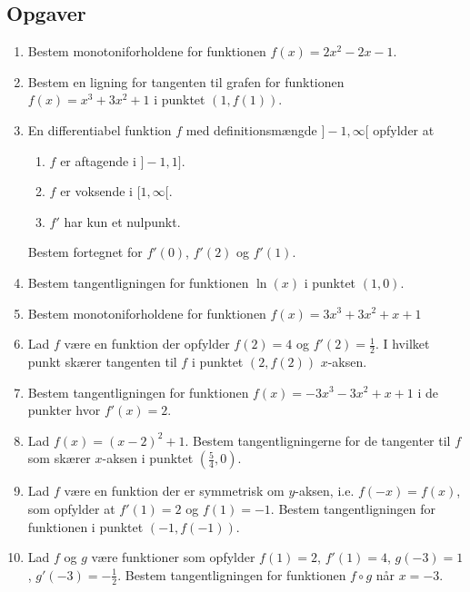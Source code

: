 \subsection{Opgaver}

\begin{enumerate}
	
	\item Bestem monotoniforholdene for funktionen $f(x)=2x^2-2x-1$.
	
	\item Bestem en ligning for tangenten til grafen for funktionen $f(x)=x^3+3x^2+1$ i punktet $(1,f(1))$.
	
	\item En differentiabel funktion  $ f $ med definitionsmængde $]-1,\infty[$ opfylder at
	\begin{enumerate}
		\item $f$ er aftagende i $]-1,1]$.
		 \item $f$ er voksende i $[1,\infty[$.
		\item $f'$ har kun et nulpunkt.
	\end{enumerate}
	Bestem fortegnet for $f'(0)$, $f'(2)$ og $f'(1)$.
	
	
	\item Bestem tangentligningen for funktionen $\ln(x)$ i punktet $(1,0)$.
	
	\item Bestem monotoniforholdene for funktionen $f(x)=3x^3+3x^2+x+1$
	

	
	\item Lad $f$ være en funktion der opfylder $f(2)=4$ og $f'(2)=\frac{1}{2}$. I hvilket punkt skærer tangenten til $f$ i punktet $(2,f(2))$ $x$-aksen.
	
	\item Bestem tangentligningen for funktionen $f(x)=-3x^3-3x^2+x+1$ i de punkter hvor $f'(x)=2$.
	
	
	\item Lad $f(x)=(x-2)^2+1$. Bestem tangentligningerne for de tangenter til $f$ som skærer $x$-aksen i punktet $(\frac{5}{4},0)$.  
	
	\item Lad $f$ være en funktion der er symmetrisk om $y$-aksen, i.e. $f(-x)=f(x)$, som opfylder at $f'(1)=2$ og $f(1)=-1$. Bestem tangentligningen for funktionen i punktet $(-1,f(-1))$. 
	
	
	\item Lad $f$ og $g$ være funktioner som opfylder $f(1)=2$, $f'(1)=4$, $g(-3)=1$, $g'(-3)=-\frac{1}{2}$. Bestem tangentligningen for funktionen $f\circ g$ når $x=-3$.
	

\end{enumerate}
